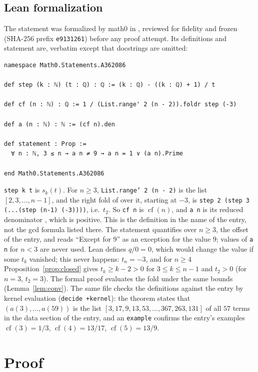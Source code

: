 \documentclass[11pt]{amsart}
\theoremstyle{plain}
\theoremstyle{definition}
\DeclareMathOperator{\cf}{cf}
\begin{document}
\subsection*{Lean formalization}
The statement was formalized by math0 in , reviewed for fidelity and frozen (SHA-256 prefix \texttt{e9131261}) before any proof attempt. Its definitions and statement are, verbatim except that docstrings are omitted:
\begin{lstlisting}
namespace Math0.Statements.A362086

def step (k : ℕ) (t : ℚ) : ℚ := (k : ℚ) - ((k : ℚ) + 1) / t

def cf (n : ℕ) : ℚ := 1 / (List.range' 2 (n - 2)).foldr step (-3)

def a (n : ℕ) : ℕ := (cf n).den

def statement : Prop :=
  ∀ n : ℕ, 3 ≤ n → a n ≠ 9 → a n = 1 ∨ (a n).Prime

end Math0.Statements.A362086
\end{lstlisting}
\texttt{step k t} is $s_k(t)$. For $n\ge3$, \texttt{List.range' 2 (n - 2)} is the list $[2,3,\dots,n-1]$, and the right fold of  over it, starting at $-3$, is \texttt{step 2 (step 3 (...(step (n-1) (-3))))}, i.e.\ $t_2$. So \texttt{cf n} is $\cf(n)$, and \texttt{a n} is its reduced denominator , which is positive. This is the definition in the name of the entry, not the gcd formula listed there. The statement quantifies over $n\ge3$, the offset of the entry, and reads ``Except for 9'' as an exception for the value $9$; values of \texttt{a n} for $n<3$ are never used.
Lean defines $q/0=0$, which would change the value if some $t_k$ vanished; this never happens: $t_n=-3$, and for $n\ge4$ Proposition~\ref{prop:closed} gives $t_k\ge k-2>0$ for $3\le k\le n-1$ and $t_2>0$ (for $n=3$, $t_2=3$). The formal proof evaluates the fold under the same bounds (Lemma~\ref{lem:conv}).
The same file checks the definitions against the entry by kernel evaluation (\texttt{decide +kernel}): the theorem  states that $(a(3),\dots,a(59))$ is the list $[3,17,9,13,53,\dots,367,263,131]$ of all $57$ terms in the data section of the entry, and an \texttt{example} confirms the entry's examples $\cf(3)=1/3$, $\cf(4)=13/17$, $\cf(5)=13/9$.

\section{Proof}\label{sec:proof}
\end{document}
